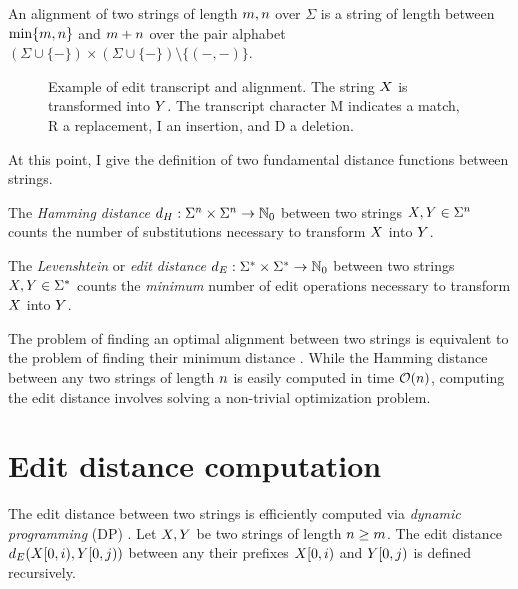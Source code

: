 \begin{definition}
\label{def:alignment}
An alignment of two strings of length $m,n$ over $\Sigma$ is a string of length between $\text{min}\{m,n\}$ and $m+n$ over the pair alphabet $(\Sigma \cup \{ - \}) \times (\Sigma \cup \{ - \}) \setminus \{ (-,-) \} $.
\end{definition}

\begin{figure}[h]
\begin{center}
\caption[Example of edit transcript and alignment]{Example of edit transcript and alignment. The string $X$ is transformed into $Y$. The transcript character M indicates a match, R a replacement, I an insertion, and D a deletion.
}
\label{fig:edit-transcript}

\end{center}
\end{figure}

At this point, I give the definition of two fundamental distance functions between strings.

\begin{definition}
\label{def:hamming}
\citep{Hamming1950} The \emph{Hamming distance} $d_H : \Sigma^{n} \times \Sigma^{n} \rightarrow \mathbb {N}_0$ between two strings $X,Y \in \Sigma^{n}$ counts the number of substitutions necessary to transform $X$ into $Y$.
\end{definition}

\begin{definition}
\label{def:edit}
\citep{Levenshtein1966} The \emph{Levenshtein} or \emph{edit distance} $d_E : \Sigma^{*} \times \Sigma^{*} \rightarrow \mathbb {N}_0$ between two strings $X,Y \in \Sigma^{*}$ counts the \emph{minimum} number of edit operations necessary to transform $X$ into $Y$.
\end{definition}

The problem of finding an optimal alignment between two strings is equivalent to the problem of finding their minimum distance \citep{Gusfield1997}.
While the Hamming distance between any two strings of length $n$ is easily computed in time $\mathcal{O}(n)$, computing the edit distance involves solving a non-trivial optimization problem.

\section{Edit distance computation}

The edit distance between two strings is efficiently computed via \emph{dynamic programming} (DP) \citep{Needleman1970}.
Let $X,Y$ be two strings of length $n \geq m$.
The edit distance $d_E(X[0,i),Y[0,j))$ between any their prefixes $X[0,i)$ and $Y[0,j)$ is defined recursively.

